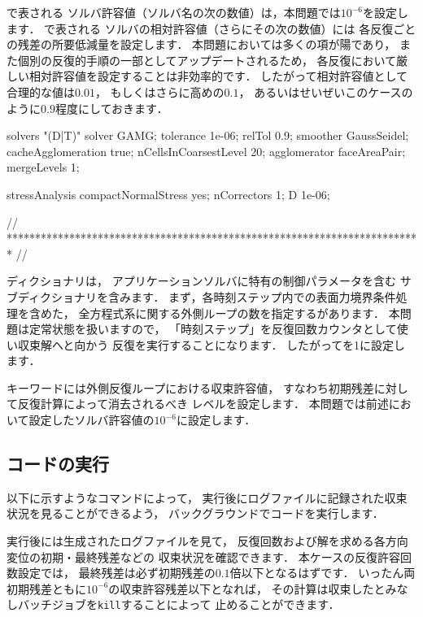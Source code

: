 %
で表される
ソルバ許容値（ソルバ名の次の数値）は，本問題では$10^{-6}$を設定します．
%
%
で表される
ソルバの相対許容値（さらにその次の数値）には
各反復ごとの残差の所要低減量を設定します．
本問題においては多くの項が陽であり，
また個別の反復的手順の一部としてアップデートされるため，
各反復において厳しい相対許容値を設定することは非効率的です．
したがって相対許容値として合理的な値は$0.01$，
もしくはさらに高めの$0.1$，
あるいはせいぜいこのケースのように$0.9$程度にしておきます．
\begin{OFverbatim}[file, linenum=17]

solvers
{
    "(D|T)"
    {
        solver          GAMG;
        tolerance       1e-06;
        relTol          0.9;
        smoother        GaussSeidel;
        cacheAgglomeration true;
        nCellsInCoarsestLevel 20;
        agglomerator    faceAreaPair;
        mergeLevels     1;
    }
}

stressAnalysis
{
    compactNormalStress yes;
    nCorrectors     1;
    D               1e-06;
}


// ************************************************************************* //
\end{OFverbatim}
ディクショナリは，
アプリケーションソルバに特有の制御パラメータを含む
サブディクショナリを含みます．
まず，各時刻ステップ内での表面力境界条件処理を含めた，
全方程式系に関する外側ループの数を指定するがあります．
本問題は定常状態を扱いますので，
「時刻ステップ」を反復回数カウンタとして使い収束解へと向かう
反復を実行することになります．
したがってを1に設定します．

キーワードには外側反復ループにおける収束許容値，
すなわち初期残差に対して反復計算によって消去されるべき
レベルを設定します．
本問題では前述において設定したソルバ許容値の$10^{-6}$に設定します．


\subsection{コードの実行}
\label{ssec:2.2.2}
以下に示すようなコマンドによって，
実行後にログファイルに記録された収束状況を見ることができるよう，
バックグラウンドでコードを実行します．
実行後には生成されたログファイルを見て，
反復回数および解を求める各方向変位の初期・最終残差などの
収束状況を確認できます．
本ケースの反復許容回数設定では，
最終残差は必ず初期残差の$0.1$倍以下となるはずです．
いったん両初期残差ともに$10^{-6}$の収束許容残差以下となれば，
その計算は収束したとみなしバッチジョブを\texttt{kill}することによって
止めることができます．


